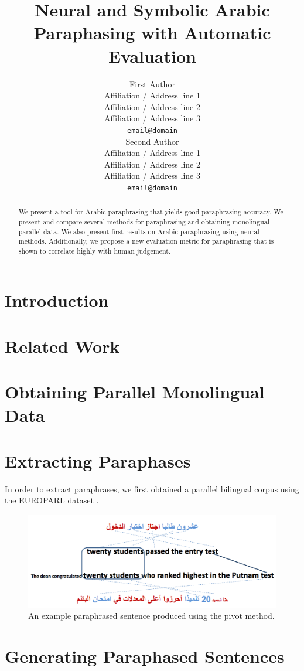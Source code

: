 \documentclass[11pt,letterpaper]{article}
\title{Neural and Symbolic Arabic Paraphasing with Automatic Evaluation}
\author{First Author \\
  Affiliation / Address line 1 \\
  Affiliation / Address line 2 \\
  Affiliation / Address line 3 \\
  {\tt email@domain} \\\And
  Second Author \\
  Affiliation / Address line 1 \\
  Affiliation / Address line 2 \\
  Affiliation / Address line 3 \\
  {\tt email@domain} \\}
\date{}
\begin{document}
\maketitle
\begin{abstract}
We present a tool for Arabic paraphrasing that yields good paraphrasing accuracy.  We present and compare several methods for paraphrasing and obtaining monolingual parallel data. We also present first results on Arabic paraphrasing using neural methods. Additionally, we propose a new evaluation metric for paraphrasing that is shown to correlate highly with human judgement.
\end{abstract}


\section{Introduction}

\section{Related Work}

\section{Obtaining Parallel Monolingual Data}

\section{Extracting Paraphases}
In order to extract paraphrases, we first obtained a parallel bilingual corpus using the EUROPARL dataset \cite{Koehn_europarl}. \cite{bannard2005bilingual}
\begin{figure}
\includegraphics[scale=0.5]{arabic_pivot}
\caption{An example paraphrased sentence produced using the pivot method. }
\end{figure}
\section{Generating Paraphased Sentences}
\end{document}
